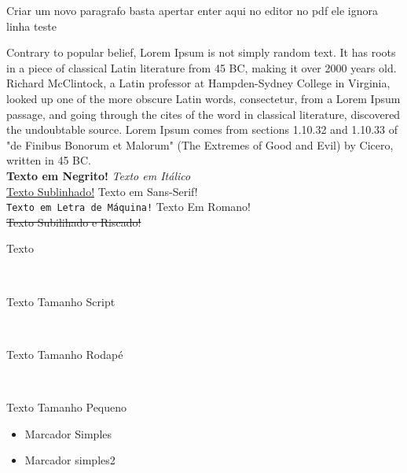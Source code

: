\documentclass[12pt, a4paper, onside]{article}
\begin{document}
Criar um novo paragrafo basta apertar enter aqui no editor no pdf ele ignora %
linha
\newline teste

Contrary to popular belief, Lorem Ipsum is not simply random text. It has roots in a piece of classical Latin literature from 45 BC, making it over 2000 years old. Richard McClintock, a Latin professor at Hampden-Sydney College in Virginia, looked up one of the more obscure Latin words, consectetur, from a Lorem Ipsum passage, and going through the cites of the word in classical literature, discovered the undoubtable source. Lorem Ipsum comes from sections 1.10.32 and 1.10.33 of "de Finibus Bonorum et Malorum" (The Extremes of Good and Evil) by Cicero, written in 45 BC. \\

\noindent
\textbf{Texto em Negrito!} \textit{Texto em Itálico}\\
\underline{Texto Sublinhado!} \textsf{Texto em Sans-Serif!}\\
\texttt{Texto em Letra de Máquina!} \textrm{Texto Em Romano!}\\
\sout{Texto Subilihado e Riscado!}\\
\begin{tiny} %
    Texto
\end{tiny}\\

\begin{scriptsize}
    Texto Tamanho Script
\end{scriptsize}\\

\begin{footnotesize}
    Texto Tamanho Rodapé
\end{footnotesize}\\

\begin{small}
    Texto Tamanho Pequeno
\end{small}
\begin{itemize}
    \item Marcador Simples
    \item Marcador simples2
\end{itemize}
\end{document}
